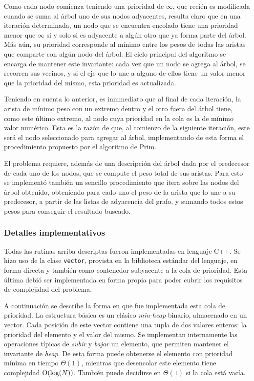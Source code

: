     Como cada nodo comienza teniendo una prioridad de $\infty$, que recién
    es modificada cuando se suma al árbol uno de sus nodos adyacentes,
    resulta claro que en una iteración determinada, un nodo que se encuentra
    encolado tiene una prioridad menor que $\infty$ si y solo si es adyacente
    a algún otro que ya forma parte del árbol. Más aún, su prioridad
    corresponde al mínimo entre los pesos de todas las aristas que comparte
    con algún nodo del árbol. El ciclo principal del algoritmo se encarga de
    mantener este invariante: cada vez que un nodo se agrega al árbol, se
    recorren sus vecinos, y si el eje que lo une a alguno de ellos tiene un
    valor menor que la prioridad del mismo, esta prioridad es actualizada.

    Teniendo en cuenta lo anterior, es inmmediato que al final de cada
    iteración, la arista de mínimo peso con un extremo dentro y el otro fuera
    del árbol tiene, como este último extremo, al nodo cuya prioridad en la
    cola es la de mínimo valor numérico. Esta es la razón de que, al comienzo
    de la siguiente iteración, este será el nodo seleccionado para agregar al
    árbol, implementando de esta forma el procedimiento propuesto por el
    algoritmo de Prim.

    El problema requiere, además de una descripción del árbol dada por el
    predecesor de cada uno de los nodos, que se compute el peso total de sus
    aristas. Para esto se implementó también un sencillo procedimiento que
    itera sobre las nodos del árbol obtenido, obteniendo para cado uno el
    peso de la arista que lo une a su predecesor, a partir de las listas de
    adyacencia del grafo, y sumando todos estos pesos para conseguir el
    resultado buscado.

    \subsubsection{Detalles implementativos}
    Todas las rutinas arriba descriptas fueron implementadas en lenguaje C++.
    Se hizo uso de la clase \texttt{vector}, provista en la biblioteca
    estándar del lenguaje, en forma directa y también como contenedor
    subyacente a la cola de prioridad. Esta última debió ser implementada en
    forma propia para poder cubrir los requisitos de complejidad del problema.

    A continuación se describe la forma en que fue implementada esta cola de
    prioridad. La estructura básica es un clásico
    \emph{min-heap} binario, almacenado en un vector. Cada posición de este
    vector contiene una tupla de dos valores enteros: la prioridad del
    elemento y el valor del mismo. Se implementan internamente las
    operaciones típicas de \emph{subir} y \emph{bajar} un elemento, que
    permiten mantener el invariante de \emph{heap}. De esta forma puede
    obtenerse el elemento con prioridad mínima en tiempo $\Theta(1)$,
    mientras que desencolar este elemento tiene complejidad $\operatorname{O}(\log(N))$.
    También puede decidirse en $\Theta(1)$ si la cola está vacía.

